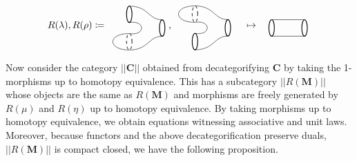 \documentclass[11pt]{amsart}
\newcommand{\cat}[1]{\mathbf{#1}}
\theoremstyle{remark}
\theoremstyle{definition}
\begin{document}
%
%
%
\[
%
%
R(\lambda) , R(\rho) \coloneqq
\raisebox{-0.5\height}{%
\begin{tikzpicture}
\begin{scope}[shift={(1.2,-0.5)}]
\draw [thick]  (1.6,-0.2) ellipse (0.1 and 0.3);
\draw [thick]  (0.4,0.3) ellipse (0.1 and 0.3);
\draw [dashed] (0.4,-0.7) ellipse (0.1 and 0.3);
\draw (0.4,0) .. controls (1,0.1) and (1,-0.5) .. (0.4,-0.4);
\draw (0.4,0.6) .. controls (1.1,0.6) and (1.1,0.1) .. (1.6,0.1);
\draw (0.4,-1) .. controls (1.1,-1) and (1.1,-0.5) .. (1.6,-0.5);
\end{scope}
\begin{scope}[shift={(1.6,-1.2)}]
\draw [dashed]  (0,0) ellipse (0.1 and 0.3);
\draw (0,0.3) .. controls (-0.8,0.3) and (-0.8,-0.3) .. (0,-0.3);
\end{scope}
\end{tikzpicture}
}
%
%
%
,
%
%
\raisebox{-0.5\height}{%
\begin{tikzpicture}
\begin{scope}[shift={(1.2,-0.5)}]
\draw [thick]  (1.6,-0.2) ellipse (0.1 and 0.3);
\draw [dashed]  (0.4,0.3) ellipse (0.1 and 0.3);
\draw [thick] (0.4,-0.7) ellipse (0.1 and 0.3);
\draw (0.4,0) .. controls (1,0.1) and (1,-0.5) .. (0.4,-0.4);
\draw (0.4,0.6) .. controls (1.1,0.6) and (1.1,0.1) .. (1.6,0.1);
\draw (0.4,-1) .. controls (1.1,-1) and (1.1,-0.5) .. (1.6,-0.5);
\end{scope}
\begin{scope}[shift={(1.6,-0.2)}]
\draw [dashed]  (0,0) ellipse (0.1 and 0.3);
\draw (0,0.3) .. controls (-0.8,0.3) and (-0.8,-0.3) .. (0,-0.3);
\end{scope}
\end{tikzpicture}
}
%
%
%
\quad \mapsto \quad
%
%
\raisebox{-0.5\height}{%
\begin{tikzpicture}
\draw [thick]  (1.6,-0.2) ellipse (0.1 and 0.3);
\draw [thick] (0.4,-0.2) ellipse (0.1 and 0.3);
\draw (0.4,0.1) -- (1.6,0.1);
\draw (0.4,-0.5) -- (1.6,-0.5);
\end{tikzpicture}
}
\]

Now consider 
the category $|| \cat{ C } ||$ 
obtained from decategorifying 
$ \cat{ C } $ by taking the 
1-morphisms up to 
homotopy equivalence.  
This has a subcategory 
	$|| R ( \cat{ M } ) ||$ 
whose objects are the same 
as $ R ( \cat{ M } ) $ and 
morphisms are freely generated by 
$ R ( \mu ) $ and $ R ( \eta ) $ 
up to homotopy equivalence.
By taking morphisms up to
homotopy equivalence,
we obtain equations witnessing
associative and unit laws.
Moreover, because functors and
the above decategorification
preserve duals,
$|| R ( \cat{ M } ) ||$ 
is compact closed, 
we have
the following proposition.
\end{document}
